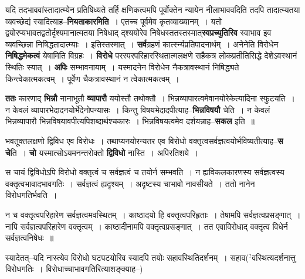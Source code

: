 \documentclass[article,12pt,a4paper]{memoir}
\newcommand{\unclear}[1]{($^{?}$#1)}
\begin{document}
	  \pstart यदि तदभाववांस्तादात्म्येन प्रतिषिध्यते तर्हि क्षणिकत्वमपि पूर्वोक्तेन न्यायेन नीलाभाववदिति तदपि तादात्म्यतया व्यवच्छेद्यं स्यादित्याह--\textbf{नियताकारमिति} । एतच्च पूर्वमेव कृतव्याख्यानम् । यतो द्वयोरप्यभावतद्वतोर्दृश्यमानात्मतया निषेधाद् द्श्ययोरेव निषेधस्ततस्तस्मात्\textbf{स्वप्रच्युतिरिव} स्वाभाव इव व्यवच्छिन्ना निषिद्धतादात्म्याः । इतिस्तस्मात् । \textbf{सर्व}ग्रहणं कार्त्स्न्यप्रतिपादनार्थम् । अनेनेति विरोधेन \textbf{निषिद्धमेकत्वं} येषामिति विग्रहः । \textbf{विरोधे} परस्परपरिहारस्थितात्मलक्षणे सहैकत्र लोकप्रतीतिसिद्धे देशेऽवस्थानं स्थितिः स्यात् । \textbf{अपिः} सम्भावनायाम् । यस्मादनेन विरोधेन नैकत्रावस्थानं निषिद्ध्यते किन्त्वेकात्मकत्वम् । पूर्वेण चैकत्रावस्थानं न त्वेकात्मकत्वम् ।
	\pend
      

	  \pstart \textbf{ततः} कारणाद् \textbf{भिन्नौ} नानाभूतौ \textbf{व्यापारौ} ययोस्तौ तथोक्तौ । भिन्नव्यापारत्वमेवानयोरेकेत्यादिना स्फुटयति । न केवलं व्यापारभेदादनयोर्भेदेनोपन्यासः । किन्तु विषयभेदादपीत्याह--\textbf{भिन्नविषयौ} चेति । न केवलं भिन्नव्यापारौ भिन्नविषयावपीत्यपिशब्दार्थश्चकारः । भिन्नविषयत्वमेव दर्शयन्नाह--\textbf{सकल} इति ॥
	\pend
      

	  \pstart भवतूक्तलक्षणो द्विविध एव विरोधः । तथाप्यनयोरन्यतर एव विरोधो वक्तृत्वसर्वज्ञत्वयोर्भविष्यतीत्याह--\textbf{स चे}ति । \textbf{चो} यस्मात्सोऽयमनन्तरोक्तो \textbf{द्विविधो} नास्ति । अपिरतिशये ।
	\pend
	  \bigskip
	  \begingroup
	

	  \pstart स चायं द्विविधोऽपि विरोधो वक्तृत्वं च सर्वज्ञत्वं च तयोर्न सम्भवति । न ह्यविकलकारणस्य सर्वज्ञत्वस्य वक्तृत्वभावादभावगतिः । सर्वज्ञत्वं ह्यदृश्यम् । अदृष्टस्य चाभावो नावसीयते । ततो नानेन विरोधगतिर्भवति ।
	\pend
        

	  \pstart न च वक्तृत्वपरिहारेण सर्वज्ञत्वमवस्थितम् । काष्ठादयो हि वक्तृत्वपरिहृताः । तेषामपि सर्वज्ञत्वप्रसङ्गात् । नापि सर्वज्ञत्वपरिहारेण वक्तृत्वम् । काष्ठादीनामपि वक्तृत्वप्रसङ्गात् । तत एवाविरोधाद् वक्तृत्व विधेर्न सर्वज्ञत्वनिषेधः ॥
	\pend
        

	  \pstart स्यादेतत्--यदि नास्त्येव विरोधो घटपटयोरिव स्यादपि तयोः सहावस्थितिदर्शनम् । सहाव\unclear{वस्थित्यदर्शनात्तु विरोधगतिः । विरोधा\edtext{}{\lemma{विरोधा}\Bfootnote{विरोधादभा \cite{dp-msB} \cite{dp-msD}}}च्चाभावगतिरित्याशङ्क्याह--}
	\pend
      
\end{document}

